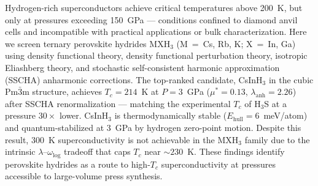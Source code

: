 
Hydrogen-rich superconductors achieve critical temperatures above 200~K,
but only at pressures exceeding 150~GPa --- conditions confined to
diamond anvil cells and incompatible with practical applications or bulk
characterization. Here we screen ternary perovskite hydrides MXH$_3$
(M~=~Cs, Rb, K; X~=~In, Ga) using density functional theory, density
functional perturbation theory, isotropic Eliashberg theory, and
stochastic self-consistent harmonic approximation (SSCHA) anharmonic
corrections. The top-ranked candidate, CsInH$_3$ in the cubic
Pm$\bar{3}$m structure, achieves $T_c = 214$~K at $P = 3$~GPa
($\mu^* = 0.13$, $\lambda_{\mathrm{anh}} = 2.26$) after SSCHA
renormalization --- matching the experimental $T_c$ of H$_3$S at a
pressure $30\times$ lower. CsInH$_3$ is thermodynamically stable
($E_{\mathrm{hull}} = 6$~meV/atom) and quantum-stabilized at 3~GPa by
hydrogen zero-point motion. Despite this result, 300~K
superconductivity is not achievable in the MXH$_3$ family due to the
intrinsic $\lambda$--$\omega_{\mathrm{log}}$ tradeoff that caps $T_c$
near $\sim 230$~K. These findings identify perovskite hydrides as a
route to high-$T_c$ superconductivity at pressures accessible to
large-volume press synthesis.
